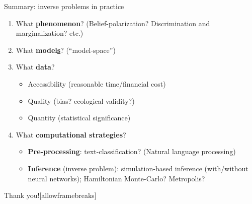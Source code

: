 \documentclass[10pt]{beamer}
\begin{document}
\begin{frame}{Summary: inverse problems in practice}
\begin{enumerate}
    \item What \textbf{phenomenon}? (Belief-polarization? Discrimination and marginalization? etc.)
    \item What \textbf{model\underline{s}}? (``model-space'')
    \item What \textbf{data}?
    \begin{itemize}
        \item Accessibility (reasonable time/financial cost)
        \item Quality (bias? ecological validity?)
        \item Quantity (statistical significance)
    \end{itemize}
    \item What \textbf{computational strategies}?
    \begin{itemize}
        \item \textbf{Pre-processing}: text-classification? (Natural language processing)
        \item \textbf{Inference} (inverse problem): simulation-based inference (with/without neural networks); Hamiltonian Monte-Carlo? Metropolis?
    \end{itemize}
\end{enumerate}
\end{frame}


\begin{frame}{Thank you!}[allowframebreaks]
    \nocite{Cranmer2020,radev2021amortized}
    \printbibliography[heading=none]
\end{frame}
\end{document}
